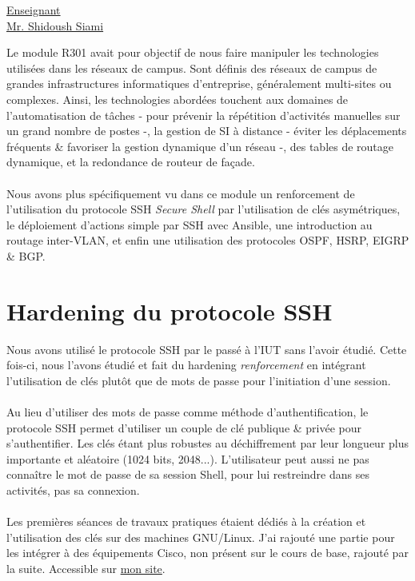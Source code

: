 \renewcommand{\figurename}{}

\vspace*{0.2cm}%
      \large
      \href{\@orientadorPagina}{\color{black}Enseignant\\Mr. Shidoush Siami}\\%
      \normalsize
\vspace*{0.5cm}%

Le module R301 avait pour objectif de nous faire manipuler les technologies utilisées dans les réseaux de campus. Sont définis des réseaux de campus de grandes infrastructures informatiques d'entreprise, généralement multi-sites ou complexes. Ainsi, les technologies abordées touchent aux domaines de l'automatisation de tâches - pour prévenir la répétition d'activités manuelles sur un grand nombre de postes -, la gestion de SI à distance - éviter les déplacements fréquents \& favoriser la gestion dynamique d'un réseau -, des tables de routage dynamique, et la redondance de routeur de façade.
\\ \\
Nous avons plus spécifiquement vu dans ce module un renforcement de l'utilisation du protocole SSH \textit{Secure Shell} par l'utilisation de clés asymétriques, le déploiement d'actions simple par SSH avec Ansible, une introduction au routage inter-VLAN, et enfin une utilisation des protocoles OSPF, HSRP, EIGRP \& BGP.

\section{Hardening du protocole SSH}

Nous avons utilisé le protocole SSH par le passé à l'IUT sans l'avoir étudié. Cette fois-ci, nous l'avons étudié et fait du hardening \textit{renforcement} en intégrant l'utilisation de clés plutôt que de mots de passe pour l'initiation d'une session.
\\ \\
Au lieu d'utiliser des mots de passe comme méthode d'authentification, le protocole SSH permet d'utiliser un couple de clé publique \& privée pour s'authentifier. Les clés étant plus robustes au déchiffrement par leur longueur plus importante et aléatoire (1024 bits, 2048...). L'utilisateur peut aussi ne pas connaître le mot de passe de sa session Shell, pour lui restreindre dans ses activités, pas sa connexion.
\\ \\
Les premières séances de travaux pratiques étaient dédiés à la création et l'utilisation des clés sur des machines GNU/Linux. J'ai rajouté une partie pour les intégrer à des équipements Cisco, non présent sur le cours de base, rajouté par la suite. Accessible sur \href{https://xeylou.fr/posts/ssh-cisco-ios/}{mon site}.

